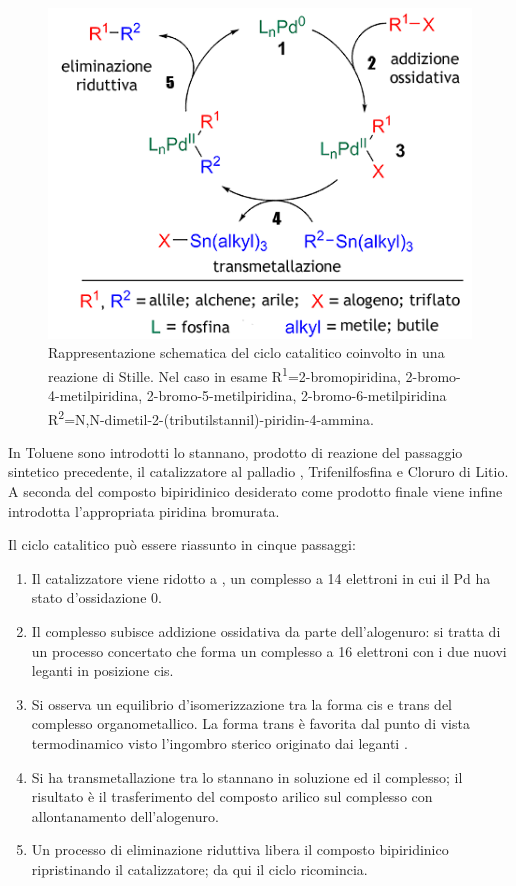 \documentclass[a4paper, 12pt]{article}
\begin{document}
\begin{figure}[H]
	\centering
	\includegraphics[width=.9\linewidth]{immagini/stille.png}
	\caption{Rappresentazione schematica del ciclo catalitico coinvolto in una reazione di Stille. Nel caso in esame R\textsuperscript{1}=2-bromopiridina, 2-bromo-4-metilpiridina, 2-bromo-5-metilpiridina, 2-bromo-6-metilpiridina R\textsuperscript{2}=N,N-dimetil-2-(tributilstannil)-piridin-4-ammina.}
	\label{fig:stille}
\end{figure}

In Toluene sono introdotti lo stannano, prodotto di reazione del passaggio sintetico precedente, il catalizzatore al palladio , Trifenilfosfina e Cloruro di Litio. A seconda del composto bipiridinico desiderato come prodotto finale viene infine introdotta l'appropriata piridina bromurata.

Il ciclo catalitico può essere riassunto in cinque passaggi:
\begin{enumerate}
	\item Il catalizzatore  viene ridotto a , un complesso a 14 elettroni in cui il Pd ha stato d'ossidazione 0.
	\item Il complesso subisce addizione ossidativa da parte dell'alogenuro: si tratta di un processo concertato che forma un complesso a 16 elettroni con i due nuovi leganti in posizione cis.
	\item Si osserva un equilibrio d'isomerizzazione tra la forma cis e trans del complesso organometallico. La forma trans è favorita dal punto di vista termodinamico visto l'ingombro sterico originato dai leganti .
	\item Si ha transmetallazione tra lo stannano in soluzione ed il complesso; il risultato è il trasferimento del composto arilico sul complesso con allontanamento dell'alogenuro.
	\item Un processo di eliminazione riduttiva libera il composto bipiridinico ripristinando il catalizzatore; da qui il ciclo ricomincia.
\end{enumerate}
\end{document}

